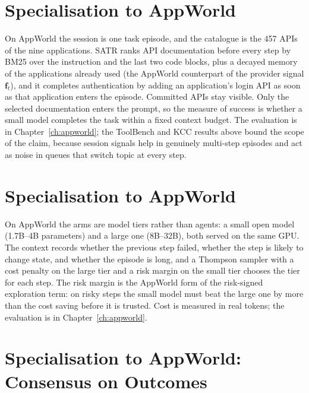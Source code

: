 \section{Specialisation to AppWorld}
\label{sec:satr-appworld}

On AppWorld the session is one task episode, and the catalogue is the 457 APIs of the nine applications.
SATR ranks API documentation before every step by BM25 over the instruction and the last two code
blocks, plus a decayed memory of the applications already used (the AppWorld counterpart of the provider
signal $\mathbf{f}_t$), and it completes authentication by adding an application's login API as soon as
that application enters the episode. Committed APIs stay visible. Only the selected documentation enters
the prompt, so the measure of success is whether a small model completes the task within a fixed context
budget. The evaluation is in Chapter~\ref{ch:appworld}; the ToolBench and KCC results above bound the
scope of the claim, because session signals help in genuinely multi-step episodes and act as noise in
queues that switch topic at every step.

\section{Specialisation to AppWorld}
\label{sec:aprr-appworld}

On AppWorld the arms are model tiers rather than agents: a small open model (1.7B--4B parameters) and a
large one (8B--32B), both served on the same GPU. The context records whether the previous step failed,
whether the step is likely to change state, and whether the episode is long, and a Thompson sampler with
a cost penalty on the large tier and a risk margin on the small tier chooses the tier for each step. The
risk margin is the AppWorld form of the risk-signed exploration term: on risky steps the small model must
beat the large one by more than the cost saving before it is trusted. Cost is measured in real tokens;
the evaluation is in Chapter~\ref{ch:appworld}.

\section{Specialisation to AppWorld: Consensus on Outcomes}
\label{sec:mncd-appworld}

